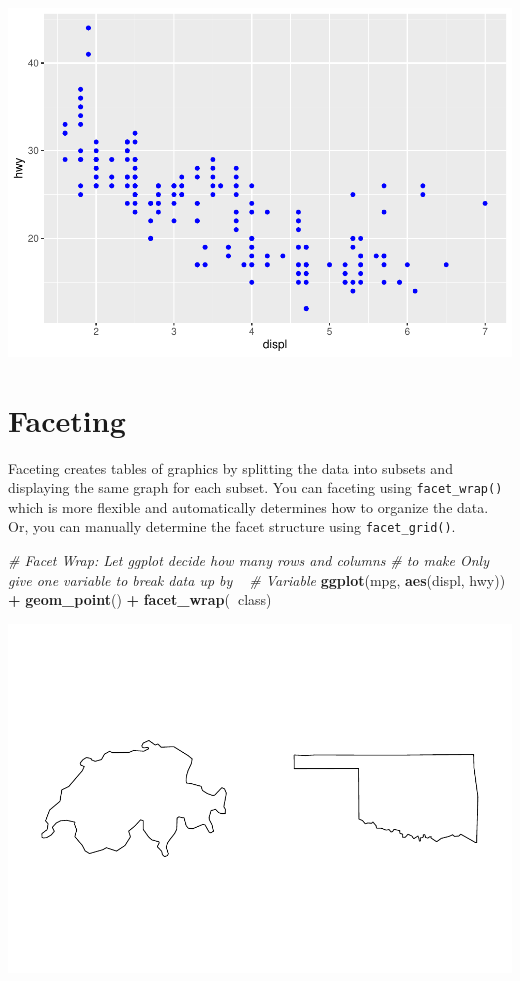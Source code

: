 \documentclass[
]{book}
\newenvironment{Shaded}{\begin{snugshade}}{\end{snugshade}}
\newcommand{\CommentTok}[1]{\textcolor[rgb]{0.56,0.35,0.01}{\textit{#1}}}
\newcommand{\KeywordTok}[1]{\textcolor[rgb]{0.13,0.29,0.53}{\textbf{#1}}}
\newcommand{\NormalTok}[1]{#1}
\newcommand{\OperatorTok}[1]{\textcolor[rgb]{0.81,0.36,0.00}{\textbf{#1}}}
\newcommand{\StringTok}[1]{\textcolor[rgb]{0.31,0.60,0.02}{#1}}
\begin{document}
\includegraphics{_main_files/figure-latex/unnamed-chunk-256-3.pdf}

\hypertarget{faceting}{%
\section{Faceting}\label{faceting}}

Faceting creates tables of graphics by splitting the data into subsets and displaying the same graph for each subset. You can faceting using \texttt{facet\_wrap()} which is more flexible and automatically determines how to organize the data. Or, you can manually determine the facet structure using \texttt{facet\_grid()}.

\begin{Shaded}
\begin{Highlighting}[]
\CommentTok{# Facet Wrap: Let ggplot decide how many rows and columns}
\CommentTok{# to make Only give one variable to break data up by ~}
\CommentTok{# Variable}
\KeywordTok{ggplot}\NormalTok{(mpg, }\KeywordTok{aes}\NormalTok{(displ, hwy)) }\OperatorTok{+}\StringTok{ }\KeywordTok{geom_point}\NormalTok{() }\OperatorTok{+}\StringTok{ }\KeywordTok{facet_wrap}\NormalTok{(}\OperatorTok{~}\NormalTok{class)}
\end{Highlighting}
\end{Shaded}

\includegraphics{_main_files/figure-latex/unnamed-chunk-257-1.pdf}
\end{document}
